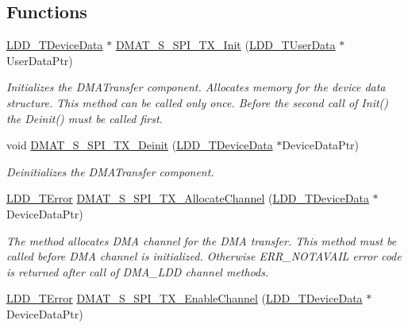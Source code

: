\subsection*{Functions}
\begin{DoxyCompactItemize}
\item 
\hyperlink{group___p_e___types__module_gac5cf1362f1f0e3a2ce71b1bf2276d091}{L\-D\-D\-\_\-\-T\-Device\-Data} $\ast$ \hyperlink{group___d_m_a_t___s___s_p_i___t_x__module_gadc51deea2770bb347ac7cc376a58aa9b}{D\-M\-A\-T\-\_\-\-S\-\_\-\-S\-P\-I\-\_\-\-T\-X\-\_\-\-Init} (\hyperlink{group___p_e___types__module_ga0b66a73f87238a782318aa0be7578e35}{L\-D\-D\-\_\-\-T\-User\-Data} $\ast$User\-Data\-Ptr)
\begin{DoxyCompactList}\small\item\em Initializes the D\-M\-A\-Transfer component. Allocates memory for the device data structure. This method can be called only once. Before the second call of Init() the Deinit() must be called first. \end{DoxyCompactList}\item 
void \hyperlink{group___d_m_a_t___s___s_p_i___t_x__module_gac57c49e243679c0878830c0538d56726}{D\-M\-A\-T\-\_\-\-S\-\_\-\-S\-P\-I\-\_\-\-T\-X\-\_\-\-Deinit} (\hyperlink{group___p_e___types__module_gac5cf1362f1f0e3a2ce71b1bf2276d091}{L\-D\-D\-\_\-\-T\-Device\-Data} $\ast$Device\-Data\-Ptr)
\begin{DoxyCompactList}\small\item\em Deinitializes the D\-M\-A\-Transfer component. \end{DoxyCompactList}\item 
\hyperlink{group___p_e___types__module_ga24c2b045fd04e79e85f261ce4df35588}{L\-D\-D\-\_\-\-T\-Error} \hyperlink{group___d_m_a_t___s___s_p_i___t_x__module_ga70b5c8f860f965e1d9d61503b9bee8a6}{D\-M\-A\-T\-\_\-\-S\-\_\-\-S\-P\-I\-\_\-\-T\-X\-\_\-\-Allocate\-Channel} (\hyperlink{group___p_e___types__module_gac5cf1362f1f0e3a2ce71b1bf2276d091}{L\-D\-D\-\_\-\-T\-Device\-Data} $\ast$Device\-Data\-Ptr)
\begin{DoxyCompactList}\small\item\em The method allocates D\-M\-A channel for the D\-M\-A transfer. This method must be called before D\-M\-A channel is initialized. Otherwise E\-R\-R\-\_\-\-N\-O\-T\-A\-V\-A\-I\-L error code is returned after call of D\-M\-A\-\_\-\-L\-D\-D channel methods. \end{DoxyCompactList}\item 
\hyperlink{group___p_e___types__module_ga24c2b045fd04e79e85f261ce4df35588}{L\-D\-D\-\_\-\-T\-Error} \hyperlink{group___d_m_a_t___s___s_p_i___t_x__module_ga522c738ebb05fecbf0be1b523eb96df9}{D\-M\-A\-T\-\_\-\-S\-\_\-\-S\-P\-I\-\_\-\-T\-X\-\_\-\-Enable\-Channel} (\hyperlink{group___p_e___types__module_gac5cf1362f1f0e3a2ce71b1bf2276d091}{L\-D\-D\-\_\-\-T\-Device\-Data} $\ast$Device\-Data\-Ptr)

\end{DoxyCompactItemize}
